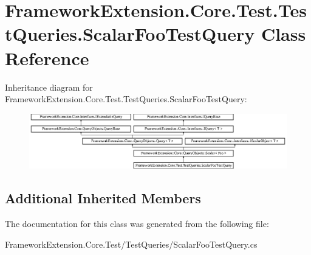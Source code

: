 \hypertarget{class_framework_extension_1_1_core_1_1_test_1_1_test_queries_1_1_scalar_foo_test_query}{\section{Framework\-Extension.\-Core.\-Test.\-Test\-Queries.\-Scalar\-Foo\-Test\-Query Class Reference}
\label{class_framework_extension_1_1_core_1_1_test_1_1_test_queries_1_1_scalar_foo_test_query}
}
Inheritance diagram for Framework\-Extension.\-Core.\-Test.\-Test\-Queries.\-Scalar\-Foo\-Test\-Query\-:\begin{figure}[H]
\begin{center}
\leavevmode
\includegraphics[height=2.393162cm]{class_framework_extension_1_1_core_1_1_test_1_1_test_queries_1_1_scalar_foo_test_query}
\end{center}
\end{figure}
\subsection*{Additional Inherited Members}


The documentation for this class was generated from the following file\-:\begin{DoxyCompactItemize}
\item 
Framework\-Extension.\-Core.\-Test/\-Test\-Queries/Scalar\-Foo\-Test\-Query.\-cs\end{DoxyCompactItemize}

